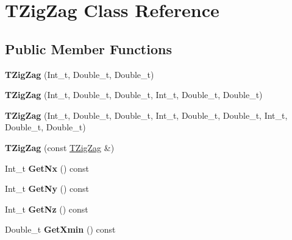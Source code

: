 \hypertarget{classTZigZag}{
\section{TZigZag Class Reference}
\label{classTZigZag}
}
\subsection*{Public Member Functions}
\begin{DoxyCompactItemize}
\item 
\hypertarget{classTZigZag_a87b35c0bfb83a92ceab80a3079fe02e1}{
{\bfseries TZigZag} (Int\_\-t, Double\_\-t, Double\_\-t)}
\label{classTZigZag_a87b35c0bfb83a92ceab80a3079fe02e1}

\item 
\hypertarget{classTZigZag_a0d136eb3964914e71acd72f36de150fb}{
{\bfseries TZigZag} (Int\_\-t, Double\_\-t, Double\_\-t, Int\_\-t, Double\_\-t, Double\_\-t)}
\label{classTZigZag_a0d136eb3964914e71acd72f36de150fb}

\item 
\hypertarget{classTZigZag_a08f3c9bea5de91756c37c4b94baf0266}{
{\bfseries TZigZag} (Int\_\-t, Double\_\-t, Double\_\-t, Int\_\-t, Double\_\-t, Double\_\-t, Int\_\-t, Double\_\-t, Double\_\-t)}
\label{classTZigZag_a08f3c9bea5de91756c37c4b94baf0266}

\item 
\hypertarget{classTZigZag_a462dfa55ecd89ad2bc8360b05df958e6}{
{\bfseries TZigZag} (const \hyperlink{classTZigZag}{TZigZag} \&)}
\label{classTZigZag_a462dfa55ecd89ad2bc8360b05df958e6}

\item 
\hypertarget{classTZigZag_adc1ecdb53be5992c0a11394bbfb6c3fb}{
Int\_\-t {\bfseries GetNx} () const }
\label{classTZigZag_adc1ecdb53be5992c0a11394bbfb6c3fb}

\item 
\hypertarget{classTZigZag_ab2c385ded9f204e378c44b0034eb61fe}{
Int\_\-t {\bfseries GetNy} () const }
\label{classTZigZag_ab2c385ded9f204e378c44b0034eb61fe}

\item 
\hypertarget{classTZigZag_a9e3d1d274aa2e845ad1ee81b8c0c5c32}{
Int\_\-t {\bfseries GetNz} () const }
\label{classTZigZag_a9e3d1d274aa2e845ad1ee81b8c0c5c32}

\item 
\hypertarget{classTZigZag_a82ae6cbfcbd5db43ab535b1abf5a85dc}{
Double\_\-t {\bfseries GetXmin} () const }
\label{classTZigZag_a82ae6cbfcbd5db43ab535b1abf5a85dc}


\end{DoxyCompactItemize}
